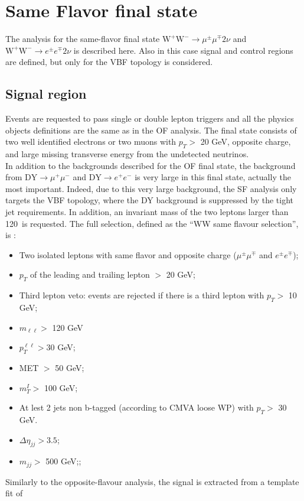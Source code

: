 \newpage
\section{Same Flavor final state}\label{sec:SF}
The analysis for the same-flavor final state $\mathrm{W^+W^-}\to \mu^{\pm}
\mu^{\mp}  2\nu$ and  $\mathrm{W^+W^-}\to e^{\pm} e^{\mp}  2\nu$ is
described here. Also in this case signal and control regions are
defined, but only for the VBF topology is considered. 
\subsection*{Signal region}
Events are requested to pass single or double lepton triggers and all the
physics objects definitions are the same as in the OF analysis.
The final state consists of two well identified electrons or two muons with
$p_T >$ 20 GeV, opposite charge, and large missing transverse energy from the undetected neutrinos.\\
In addition to the backgrounds described for the OF final state, the
background from $\mathrm{DY}\to \mu^{+} \mu^{-}$ and
$\mathrm{DY}\to e^{+} e^{-}$ is very large in this final state,
actually the most important. 
Indeed, due to this very large background, the SF analysis only targets the
VBF topology, where the DY background is suppressed by the tight 
jet requirements. In addition, an invariant mass of the two leptons larger
than 120~\GeV is requested.
The full selection, defined as the ``WW same flavour selection'', is :
\begin{itemize}
\item Two isolated leptons with same flavor and opposite charge ($\mu ^{\pm} \mu^{\mp}$ and $e^{\pm} e^{\mp}$);
\item $p_T$ of the leading and trailing lepton $>$ 20 GeV;
\item Third lepton veto: events are rejected if there is a third lepton with $p_T  >$ 10 GeV;
\item  $m_{\ell \ell} >$ 120 GeV 
\item $p_T^{\ell \ell} >$30 GeV;
\item MET $>$ 50 GeV;
\item $m_T^I >$ 100 GeV;
\item At lest 2 jets non b-tagged (according to CMVA loose WP) with $p_T >$ 30 GeV.
\item $\Delta \eta_{jj} > 3.5$;
\item $m_{jj} >$ 500 GeV;;
\end{itemize}
Similarly to the opposite-flavour analysis, the signal is extracted from a template fit of
